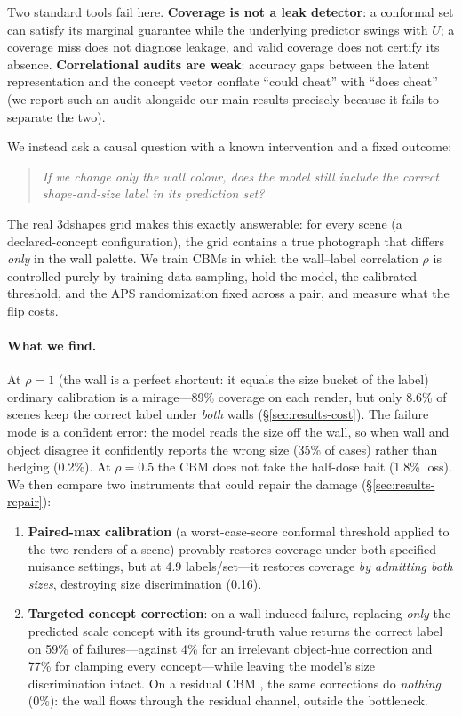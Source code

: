 \documentclass[11pt]{article}
\begin{document}
Two standard tools fail here. \textbf{Coverage is not a leak detector}: a
conformal set \citep{vovk2005algorithmic,romano2020classification} can satisfy
its marginal guarantee while the underlying predictor swings with $U$; a
coverage miss does not diagnose leakage, and valid coverage does not certify
its absence. \textbf{Correlational audits are weak}: accuracy gaps between the
latent representation and the concept vector conflate ``could cheat'' with
``does cheat'' (we report such an audit alongside our main results precisely
because it fails to separate the two).

We instead ask a causal question with a known intervention and a fixed outcome:
\begin{quote}
\emph{If we change only the wall colour, does the model still include the
correct shape-and-size label in its prediction set?}
\end{quote}
The real 3dshapes grid \citep{burgess2018disentangling} makes this exactly
answerable: for every scene (a declared-concept configuration), the grid
contains a true photograph that differs \emph{only} in the wall palette. We
train CBMs in which the wall--label correlation $\rho$ is controlled purely by
training-data sampling, hold the model, the calibrated threshold, and the APS
randomization fixed across a pair, and measure what the flip costs.

\paragraph{What we find.} At $\rho=1$ (the wall is a perfect shortcut: it
equals the size bucket of the label) ordinary calibration is a mirage---89\%
coverage on each render, but only 8.6\% of scenes keep the correct label under
\emph{both} walls (\S\ref{sec:results-cost}). The failure mode is a confident
error: the model reads the size off the wall, so when wall and object disagree
it confidently reports the wrong size (35\% of cases) rather than hedging
(0.2\%). At $\rho=0.5$ the CBM does not take the half-dose bait (1.8\% loss).
We then compare two instruments that could repair the damage
(\S\ref{sec:results-repair}):

\begin{enumerate}
\item \textbf{Paired-max calibration} (a worst-case-score conformal threshold
\citep{zargarbashi2024robust} applied to the two renders of a scene)
provably restores coverage under both specified nuisance settings, but at
4.9 labels/set---it restores coverage \emph{by admitting both sizes},
destroying size discrimination (0.16).
\item \textbf{Targeted concept correction}: on a wall-induced failure,
replacing \emph{only} the predicted scale concept with its ground-truth value
returns the correct label on 59\% of failures---against 4\% for an irrelevant
object-hue correction and 77\% for clamping every concept---while leaving the
model's size discrimination intact. On a residual CBM
\citep{mahinpei2021promises}, the same corrections do \emph{nothing} (0\%):
the wall flows through the residual channel, outside the bottleneck.
\end{enumerate}
\end{document}
